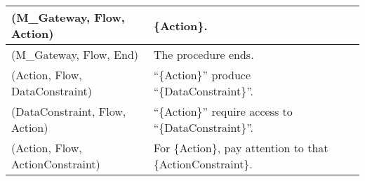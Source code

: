 \begin{table*}[t]
{\begin{tabular}{|l|l|}
(M\_Gateway, Flow, Action)                             & \{Action\}.   
\\ \hline
(M\_Gateway, Flow, End)                                & The procedure ends.                                         \\ \hline
(Action, Flow, DataConstraint)                         & ``\{Action\}'' produce ``\{DataConstraint\}''.              \\ \hline
(DataConstraint, Flow, Action)                         & ``\{Action\}'' require access to ``\{DataConstraint\}''.    \\ \hline
(Action, Flow, ActionConstraint)                       & For \{Action\}, pay attention to that \{ActionConstraint\}. \\ \hline
\end{tabular}
}
\vspace{10pt}
\end{table*}